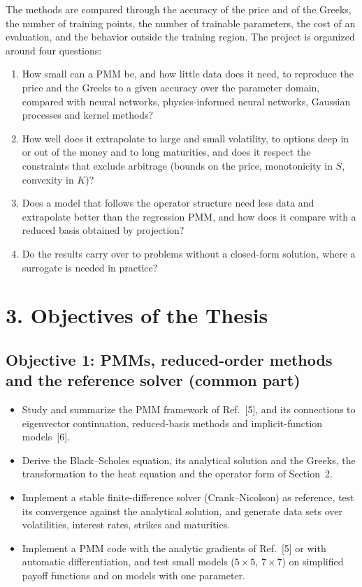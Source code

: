 \documentclass[12pt,a4paper]{article}
\begin{document}
The methods are compared through the accuracy of the price and of the
Greeks, the number of training points, the number of trainable
parameters, the cost of an evaluation, and the behavior outside the
training region.  The project is organized around four questions:
\begin{enumerate}
  \item How small can a PMM be, and how little data does it need, to
  reproduce the price and the Greeks to a given accuracy over the
  parameter domain, compared with neural networks, physics-informed
  neural networks, Gaussian processes and kernel methods?
  \item How well does it extrapolate to large and small volatility,
  to options deep in or out of the money and to long maturities, and
  does it respect the constraints that exclude arbitrage (bounds on
  the price, monotonicity in $S$, convexity in $K$)?
  \item Does a model that follows the operator structure need less
  data and extrapolate better than the regression PMM, and how does
  it compare with a reduced basis obtained by projection?
  \item Do the results carry over to problems without a closed-form
  solution, where a surrogate is needed in practice?
\end{enumerate}

\section*{3. Objectives of the Thesis}

\subsection*{Objective 1: PMMs, reduced-order methods and the reference solver (common part)}
\begin{itemize}
    \item Study and summarize the PMM framework of Ref.~[5], and its
    connections to eigenvector continuation, reduced-basis methods and
    implicit-function models~[6].
    \item Derive the Black--Scholes equation, its analytical solution
    and the Greeks, the transformation to the heat equation and the
    operator form of Section~2.
    \item Implement a stable finite-difference solver
    (Crank--Nicolson) as reference, test its convergence against the
    analytical solution, and generate data sets over volatilities,
    interest rates, strikes and maturities.
    \item Implement a PMM code with the analytic gradients of
    Ref.~[5] or with automatic differentiation, and test small models
    ($5\times5$, $7\times7$) on simplified payoff functions and on
    models with one parameter.
\end{itemize}
\end{document}
